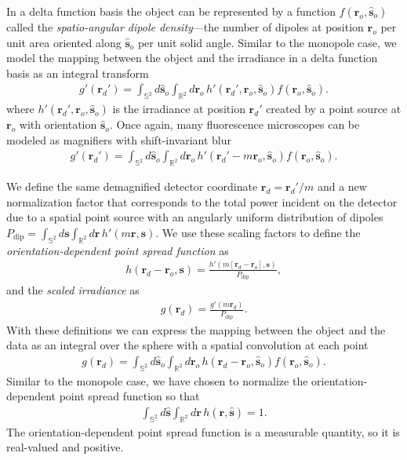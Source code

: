 \documentclass[]{osa-article}
\providecommand{\mb}[1]{\mathbf{#1}}
\providecommand{\ro}{\mathbf{\mathbf{r}}_o}
\providecommand{\so}{\mathbf{\hat{s}}_o}
\providecommand{\rd}{\mathbf{r}_d}
\providecommand{\mh}[1]{\mathbf{\hat{#1}}}
\providecommand{\mbb}[1]{\mathbb{#1}}
\begin{document}
In a delta function basis the object can be represented by a function
$f(\ro, \so)$ called the \textit{spatio-angular dipole density}---the number of
dipoles at position $\ro{}$ per unit area oriented along $\so{}$ per unit solid
angle. Similar to the monopole case, we model the mapping between the object and
the irradiance in a delta function basis as an integral transform
\begin{align}
  g'(\rd') = \int_{\mbb{S}^2}d\so\int_{\mbb{R}^2}d\ro\, h'(\rd', \ro, \so)f(\ro, \so). 
\end{align}
where $h'(\rd', \ro, \so)$ is the irradiance at position $\rd'$ created by a
point source at $\ro$ with orientation $\so$. Once again, many fluorescence
microscopes can be modeled as magnifiers with shift-invariant blur
\begin{align}
  g'(\rd') = \int_{\mbb{S}^2}d\so\int_{\mbb{R}^2}d\ro\, h'(\rd' - m\ro, \so)f(\ro, \so). 
\end{align}

We define the same demagnified detector coordinate $\rd = \rd'/m$ and a new
normalization factor that corresponds to the total power incident on the
detector due to a spatial point source with an angularly uniform distribution of
dipoles
$P_\text{dip} = \int_{\mbb{S}^2}d\mb{s}\int_{\mbb{R}^2}d\mb{r}\, h'(m\mb{r},
\mb{s})$. We use these scaling factors to define the
\textit{orientation-dependent point spread function} as
\begin{align}
  h(\rd - \ro, \mb{s}) = \frac{h'(m[\rd - \ro], \mb{s})}{P_\text{dip}}, 
\end{align}
and the \textit{scaled irradiance} as 
\begin{align}
  g(\rd) = \frac{g'(m\rd)}{P_\text{dip}}. 
\end{align}
With these definitions we can express the mapping between the object and the
data as an integral over the sphere with a spatial convolution at each point
\begin{align}
g(\rd{}) = \int_{\mbb{S}^2}d\so{}\int_{\mbb{R}^2}d\ro{}\, h(\rd{} -\ro{}, \so{})f(\ro, \so). \label{eq:odpsf}
\end{align}
Similar to the monopole case, we have chosen to normalize the orientation-dependent point spread function so that
\begin{align}
  \int_{\mbb{S}^2}d\mh{s}\int_{\mbb{R}^2}d\mb{r}\, h(\mb{r}, \mh{s}) = 1. 
\end{align}
The orientation-dependent point spread function is a measurable quantity, so it
is real-valued and positive.
\end{document}
